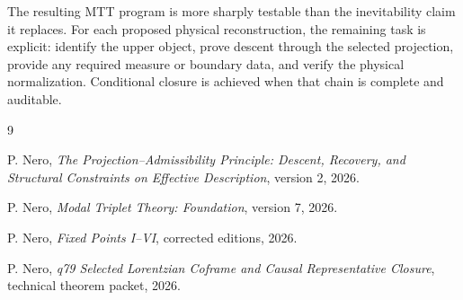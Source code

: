 \documentclass[11pt]{article}
\begin{document}
The resulting MTT program is more sharply testable than the inevitability
claim it replaces.  For each proposed physical reconstruction, the remaining
task is explicit: identify the upper object, prove descent through the selected
projection, provide any required measure or boundary data, and verify the
physical normalization.  Conditional closure is achieved when that chain is
complete and auditable.

\begin{thebibliography}{9}

P. Nero,
\emph{The Projection--Admissibility Principle: Descent, Recovery, and
Structural Constraints on Effective Description}, version 2, 2026.

P. Nero,
\emph{Modal Triplet Theory: Foundation}, version 7, 2026.

P. Nero,
\emph{Fixed Points I--VI}, corrected editions, 2026.

P. Nero,
\emph{q79 Selected Lorentzian Coframe and Causal Representative Closure},
technical theorem packet, 2026.

\end{thebibliography}
\end{document}

